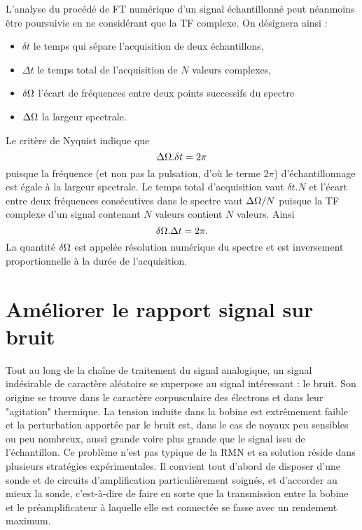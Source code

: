 L'analyse du procédé de FT numérique d'un signal échantillonné peut
néanmoins être poursuivie en ne considérant que la TF complexe. 
On désignera ainsi :
\begin{itemize}
\item $\delta t$ le temps qui sépare l'acquisition de deux échantillons,
\item $\Delta t$ le temps total de l'acquisition de $N$ valeurs complexes,
\item $\delta \Omega$ l'écart de fréquences entre deux points successifs du spectre
\item $\Delta \Omega$ la largeur spectrale.
\end{itemize}

Le critère de Nyquist indique que
\begin{equation}
\Delta \Omega . \delta t = 2\pi
\end{equation}
puisque la fréquence (et non pas la pulsation, d'où le terme $2\pi$)
d'échantillonnage est égale à la largeur spectrale.
Le temps total d'acquisition vaut $\delta t . N$ et l'écart
entre deux fréquences consécutives dans le spectre vaut
$\Delta \Omega/N$ puisque la TF complexe d'un signal contenant $N$
valeurs contient $N$ valeurs. Ainsi
\begin{equation}
\delta \Omega . \Delta t = 2\pi.
\end{equation}
La quantité $\delta\Omega$ est appelée résolution numérique du spectre
et est inversement proportionnelle à la durée de l'acquisition.

\section{Améliorer le rapport signal sur bruit}
Tout au long de la chaîne de traitement du signal analogique, un signal indésirable de 
caractère aléatoire se superpose au signal intéressant : le bruit. 
Son origine se trouve dans le caractère corpusculaire des électrons 
et dans leur "agitation" thermique. 
La tension induite dans la bobine est extrêmement faible et la perturbation 
apportée par le bruit est, dans le cas de noyaux peu sensibles ou peu nombreux, 
aussi grande voire plus grande que le signal issu de l'échantillon. 
Ce problème n'est pas typique de la RMN et sa solution 
réside dans plusieurs stratégies expérimentales. 
Il convient tout d'abord de disposer d'une sonde et de circuits d'amplification 
particulièrement soignés, et d'accorder au 
mieux la sonde, c'est-à-dire de faire en sorte que la transmission entre
la bobine et le préamplificateur à laquelle elle est connectée se fasse
avec un rendement maximum.

